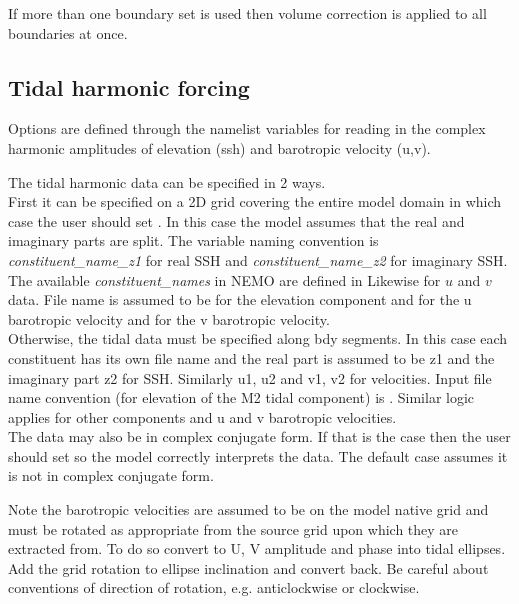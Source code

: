 \documentclass[../main/NEMO_manual]{subfiles}
\begin{document}
If more than one boundary set is used then volume correction is
applied to all boundaries at once.

\subsection{Tidal harmonic forcing}
\label{subsec:BDY_tides}



Options are defined through the  namelist variables 
for reading in the complex harmonic amplitudes of elevation (ssh) and barotropic velocity (u,v). 

The tidal harmonic data can be specified in 2 ways.\\
First it can be specified on a 2D grid covering the entire model domain in which case the user should set . 
In this case the model assumes that the real and imaginary parts are split.
The variable naming convention is \textit{constituent\_name\_z1} for real SSH and \textit{constituent\_name\_z2} for imaginary SSH. 
The available \textit{constituent\_names} in NEMO are defined in 
Likewise for $u$ and $v$ data. File name is assumed to be  for the elevation component 
and  for the u barotropic velocity and  for the v barotropic velocity.\\ 
Otherwise, the tidal data must be specified along bdy segments. 
In this case each constituent has its own file name and the real part is assumed to be z1 and the imaginary part z2 for SSH. 
Similarly u1, u2 and v1, v2 for velocities. Input file name convention (for elevation of the M2 tidal component) is . 
Similar logic applies for other components and u and v barotropic velocities.\\

The data may also be in complex conjugate form. If that is the case then the user should set  
so the model correctly interprets the data. The default case assumes it is not in complex conjugate form. 

Note the barotropic velocities are assumed to be on the model native grid and must be rotated as appropriate from the source grid upon which they are extracted from. 
To do so convert to U, V amplitude and phase into tidal ellipses. Add the grid rotation to ellipse inclination and convert back. Be careful about conventions 
of direction of rotation, e.g. anticlockwise or clockwise. 

\biblio

\pindex
\end{document}
